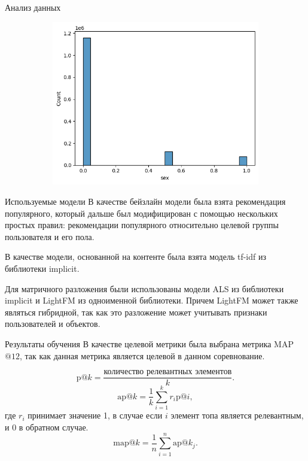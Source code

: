 \documentclass{beamer}
\begin{document}
\begin{frame}{Анализ данных}
\begin{figure}
\begin{subfigure}{.5\textwidth}
      \label{fig:sfig2}
    \end{subfigure}
    \begin{subfigure}{.5\textwidth}
      \centering
      \includegraphics[width=.8\linewidth]{11}
      \label{fig:sfig3}
    \end{subfigure}
    \label{fig:fig}
    \end{figure}
\end{frame}

\begin{frame}{Используемые модели}
  В качестве бейзлайн модели была взята рекомендация популярного, который дальше был модифицирован с помощью нескольких простых правил:
  рекомендации популярного относительно целевой группы пользователя и его пола.

  В качестве модели, основанной на контенте была взята модель tf-idf из библиотеки implicit.

  Для матричного разложения были использованы модели ALS из библиотеки implicit и LightFM из одноименной библиотеки.
  Причем LightFM может также являться гибридной, так как это разложение может учитывать признаки пользователей и объектов. 
\end{frame}

\begin{frame}{Результаты обучения}
  В качестве целевой метрики была выбрана метрика MAP$@12$, так как данная метрика является целевой в данном соревнование.

  \begin{equation}
    \text{p}@k = \frac{\text{количество релевантных элементов}}{k}.
  \end{equation}
  \begin{equation}
    \text{ap}@k = \frac{1}{k}\sum_{i=1}^{k}r_i\text{p}@i,
  \end{equation}
  где $r_i$ принимает значение 1, в случае если $i$ элемент топа является релевантным, и 0 в обратном случае.
  \begin{equation}
    \text{map}@k = \frac{1}{n}\sum_{i=1}^{n}\text{ap}@k_j.
  \end{equation}
\end{frame}
\end{document}
